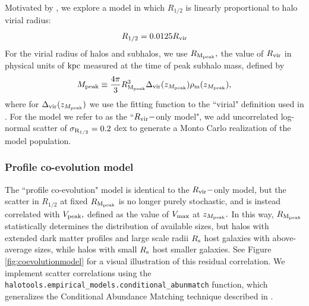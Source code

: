 \documentclass[usenatbib,usegraphicx,letterpaper]{mn2e}
\newcommand{\beq}{\begin{equation}}
\newcommand{\eeq}{\end{equation}}
\newcommand{\rhalf}{R_{1/2}}
\newcommand{\sigmarhalf}{\sigma_{\rm R_{1/2}}}
\newcommand{\mpeak}{M_{\rm peak}}
\newcommand{\zpeak}{z_{M_{\rm peak}}}
\newcommand{\rvir}{R_{\rm vir}}
\newcommand{\rmpeak}{R_{\rm M_{peak}}}
\newcommand{\vmaxmpeak}{V_{\rm peak}}
\newcommand{\vmax}{V_{\rm max}}
\newcommand{\kpc}{{\rm kpc}}
\begin{document}
Motivated by \citet{kravtsov13}, we explore a model in which $\rhalf$ is linearly proportional to halo virial radius:
\beq
\label{eq:fiducial_model}
\rhalf = 0.0125\rvir
\eeq
For the virial radius of halos and subhalos, we use $\rmpeak,$ the value of $\rvir$ in physical units of $\kpc$ measured at the time of peak subhalo mass, defined by
\beq
\mpeak\equiv\frac{4\pi}{3}\rmpeak^{3}\Delta_{\rm vir}(\zpeak)\rho_{\rm m}(\zpeak),
\eeq
where for $\Delta_{\rm vir}(\zpeak)$ we use the fitting function to the ``virial" definition used in \citet{bryan_norman98}. For the model we refer to as the ``$\rvir-$only model", we add uncorrelated log-normal scatter of $\sigmarhalf=0.2$ dex to generate a Monto Carlo realization of the model population.

\subsubsection{Profile co-evolution model}
\label{subsubsec:coevolutionmodel}

The ``profile co-evolution" model is identical to the $\rvir-$only model, but the scatter in $\rhalf$ at fixed $\rmpeak$ is no longer purely stochastic, and is instead correlated with $\vmaxmpeak,$ defined as the value of $\vmax$ at $\zpeak.$ In this way, $\rmpeak$ statistically determines the distribution of available sizes, but halos with extended dark matter profiles and large scale radii $R_{\rm s}$ host galaxies with above-average sizes, while halos with small $R_{\rm s}$ host smaller galaxies. See Figure \ref{fig:coevolutionmodel} for a visual illustration of this residual correlation. We implement scatter correlations using the {\tt halotools.empirical\_models.conditional\_abunmatch} function, which generalizes the Conditional Abundance Matching technique described in \citet{hearin_etal13b}.
\end{document}
